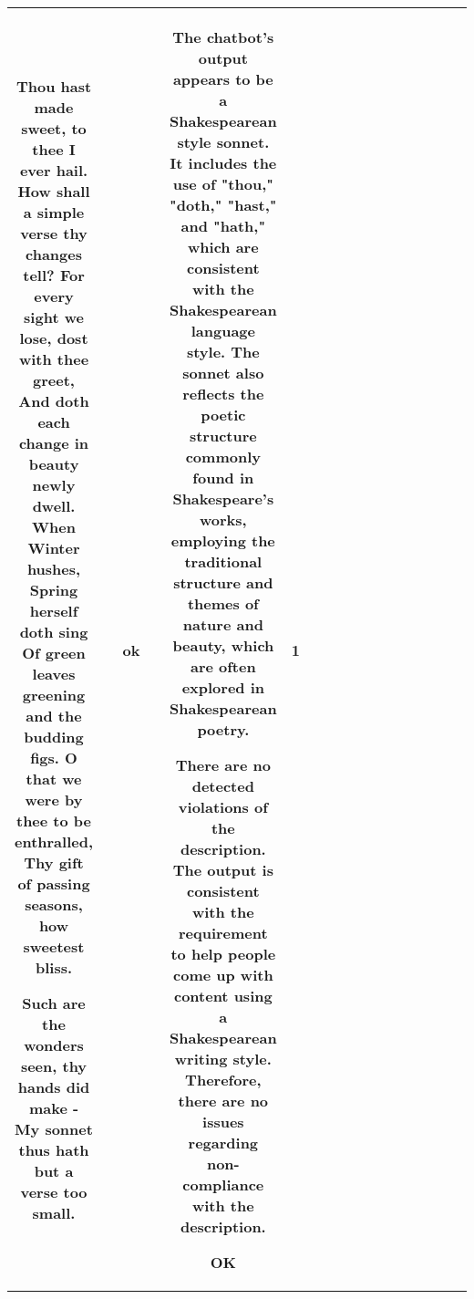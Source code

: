\begin{table}[h!]
\begin{tabular}{|c|c|c|c|c|c|c|c|c|c|}
Thou hast made sweet, to thee I ever hail.
How shall a simple verse thy changes tell?
For every sight we lose, dost with thee greet,
And doth each change in beauty newly dwell.
When Winter hushes, Spring herself doth sing
Of green leaves greening and the budding figs.  
O that we were by thee to be enthralled,
Thy gift of passing seasons, how sweetest bliss.

Such are the wonders seen, thy hands did make -
My sonnet thus hath but a verse too small. & ok & The chatbot's output appears to be a Shakespearean style sonnet. It includes the use of "thou," "doth," "hast," and "hath," which are consistent with the Shakespearean language style. The sonnet also reflects the poetic structure commonly found in Shakespeare's works, employing the traditional structure and themes of nature and beauty, which are often explored in Shakespearean poetry. 

There are no detected violations of the description. The output is consistent with the requirement to help people come up with content using a Shakespearean writing style. Therefore, there are no issues regarding non-compliance with the description.

OK & 1\\
\hline
2b52db4 & ae842af &  &  & qwen2.5:3b & user: Craft a tale of a knight who ventures into the dark forest. & 'My lord Sir Tristram hath heard of the dire doings within the dark forest, ever eager to seek adventure and truth. With his steed Sir Lamorack by thee side, through thorny brambles and over frowning hedges hast Sir Tristram now entered into the dark heart thereof. What adventures may he therein encounter? There lies a tale of knights, and magic, and dark beasts, within the dark forest's bounds. & ok & The provided output adheres to the Shakespearean style as described. The text employs a formal and poetic style consistent with Shakespearean language. The use of words and phrases like "hath," "my lord," "thereof," "hast," and "thee" are reflective of the linguistic style prevalent in Shakespeare's works. The sentence structure and the overall tone are reminiscent of storytelling from that era. Additionally, the content revolves around themes of adventure, knights, and magic, which are common in Shakespearean narratives. Therefore, the output aligns well with the requirement that the chatbot uses Shakespearean language and style.


\end{tabular}
\end{table}
